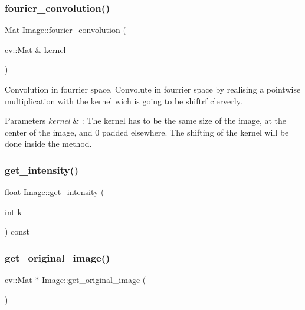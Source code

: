 \subsubsection{\texorpdfstring{fourier\+\_\+convolution()}{fourier\_convolution()}}
{\footnotesize\ttfamily Mat Image\+::fourier\+\_\+convolution (\begin{DoxyParamCaption}\item[{cv\+::\+Mat \&}]{kernel }\end{DoxyParamCaption})}



Convolution in fourrier space. Convolute in fourrier space by realising a pointwise multiplication with the kernel wich is going to be shiftrf clerverly. 


\begin{DoxyParams}{Parameters}
{\em kernel} & \+: The kernel has to be the same size of the image, at the center of the image, and 0 padded elsewhere. The shifting of the kernel will be done inside the method. \\
\hline
\end{DoxyParams}
\mbox{\label{class_image_ac4485f01ef5b1e741e8c2eaee781f2ab}} 
\subsubsection{\texorpdfstring{get\+\_\+intensity()}{get\_intensity()}}
{\footnotesize\ttfamily float Image\+::get\+\_\+intensity (\begin{DoxyParamCaption}\item[{int}]{k }\end{DoxyParamCaption}) const}

\mbox{\label{class_image_aec03ea9e28674da4821f28c984bfe3a8}} 
\subsubsection{\texorpdfstring{get\+\_\+original\+\_\+image()}{get\_original\_image()}}
{\footnotesize\ttfamily cv\+::\+Mat $\ast$ Image\+::get\+\_\+original\+\_\+image (\begin{DoxyParamCaption}{ }\end{DoxyParamCaption})}


